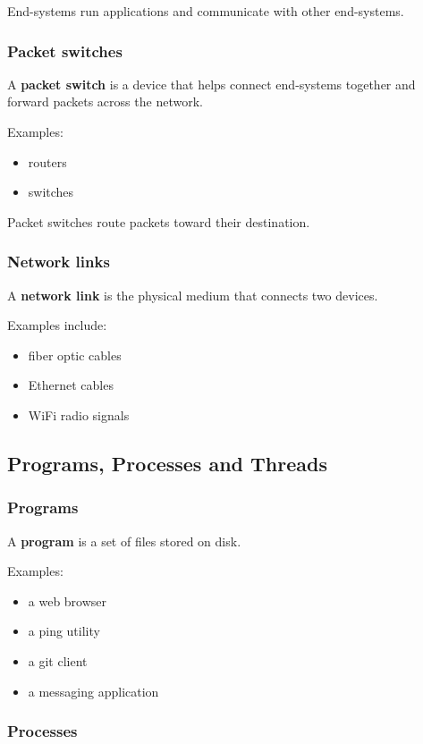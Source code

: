 End-systems run applications and communicate with other end-systems.

\subsubsection{Packet switches}

A \textbf{packet switch} is a device that helps connect end-systems together and forward packets across the network.

Examples:
\begin{itemize}
\item routers
\item switches
\end{itemize}

Packet switches route packets toward their destination.

\subsubsection{Network links}

A \textbf{network link} is the physical medium that connects two devices.

Examples include:

\begin{itemize}
\item fiber optic cables
\item Ethernet cables
\item WiFi radio signals
\end{itemize}

\subsection{Programs, Processes and Threads}

\subsubsection{Programs}

A \textbf{program} is a set of files stored on disk.

Examples:
\begin{itemize}
\item a web browser
\item a ping utility
\item a git client
\item a messaging application
\end{itemize}

\subsubsection{Processes}


